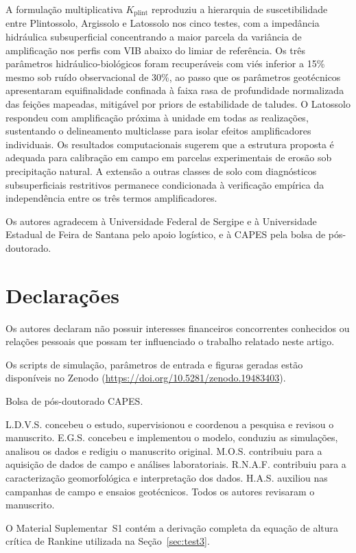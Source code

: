 \documentclass[pdflatex,sn-basic]{sn-jnl}
\begin{document}
A formulação multiplicativa $K_{\mathrm{plint}}$ reproduziu a hierarquia de suscetibilidade entre Plintossolo, Argissolo e Latossolo nos cinco testes, com a impedância hidráulica subsuperficial concentrando a maior parcela da variância de amplificação nos perfis com VIB abaixo do limiar de referência. Os três parâmetros hidráulico-biológicos foram recuperáveis com viés inferior a 15\% mesmo sob ruído observacional de 30\%, ao passo que os parâmetros geotécnicos apresentaram equifinalidade confinada à faixa rasa de profundidade normalizada das feições mapeadas, mitigável por priors de estabilidade de taludes. O Latossolo respondeu com amplificação próxima à unidade em todas as realizações, sustentando o delineamento multiclasse para isolar efeitos amplificadores individuais. Os resultados computacionais sugerem que a estrutura proposta é adequada para calibração em campo em parcelas experimentais de erosão sob precipitação natural. A extensão a outras classes de solo com diagnósticos subsuperficiais restritivos permanece condicionada à verificação empírica da independência entre os três termos amplificadores.

\backmatter


Os autores agradecem à Universidade Federal de Sergipe e à Universidade Estadual de Feira de Santana pelo apoio logístico, e à CAPES pela bolsa de pós-doutorado.

\section*{Declarações}

 Os autores declaram não possuir interesses financeiros concorrentes conhecidos ou relações pessoais que possam ter influenciado o trabalho relatado neste artigo.

 Os scripts de simulação, parâmetros de entrada e figuras geradas estão disponíveis no Zenodo (\url{https://doi.org/10.5281/zenodo.19483403}).

 Bolsa de pós-doutorado CAPES.

 L.D.V.S. concebeu o estudo, supervisionou e coordenou a pesquisa e revisou o manuscrito. E.G.S. concebeu e implementou o modelo, conduziu as simulações, analisou os dados e redigiu o manuscrito original. M.O.S. contribuiu para a aquisição de dados de campo e análises laboratoriais. R.N.A.F. contribuiu para a caracterização geomorfológica e interpretação dos dados. H.A.S. auxiliou nas campanhas de campo e ensaios geotécnicos. Todos os autores revisaram o manuscrito.

 O Material Suplementar~S1 contém a derivação completa da equação de altura crítica de Rankine utilizada na Seção~\ref{sec:test3}.


\end{document}

